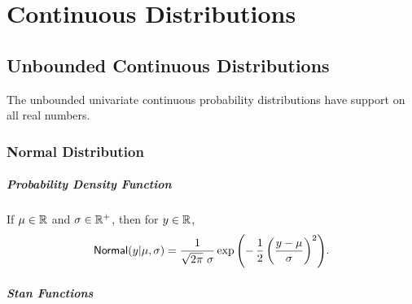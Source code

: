 \part{Continuous Distributions}\label{continuous-prob-functions.part}



\chapter{Unbounded Continuous Distributions}

\noindent
The unbounded univariate continuous probability distributions have
support on all real numbers.


\section{Normal Distribution}\label{normal-distribution.section}

\subsubsection{Probability Density Function}

If $\mu \in \mathbb{R}$ and $\sigma \in \mathbb{R}^+$, then for $y \in
\mathbb{R}$,
\[
\mbox{\sf Normal}(y|\mu,\sigma)
=
\frac{1}{\sqrt{2 \pi} \ \sigma}
\exp\left( - \, \frac{1}{2}
           \left(  \frac{y - \mu}{\sigma} \right)^2
    \right)
\!.
\]


\subsubsection{Stan Functions}


